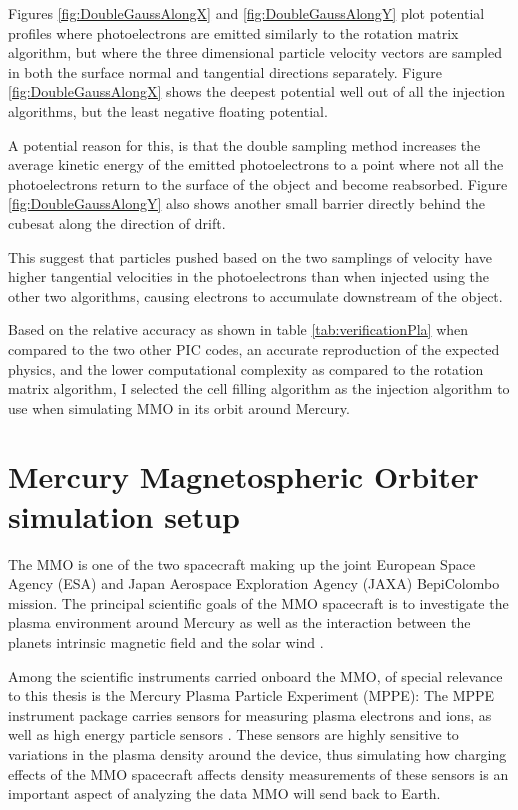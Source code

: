 Figures \ref{fig:DoubleGaussAlongX} and \ref{fig:DoubleGaussAlongY} plot potential profiles where photoelectrons are emitted similarly to the rotation matrix algorithm, but where the three dimensional particle velocity vectors are sampled in both the surface normal and tangential directions separately. Figure \ref{fig:DoubleGaussAlongX} shows the deepest potential well out of all the injection algorithms, but the least negative floating potential. 

A potential reason for this, is that the double sampling method increases the average kinetic energy of the emitted photoelectrons to a point where not all the photoelectrons return to the surface of the object and become reabsorbed. Figure \ref{fig:DoubleGaussAlongY} also shows another small barrier directly behind the cubesat along the direction of drift. 

This suggest that particles pushed based on the two samplings of velocity have higher tangential velocities in the photoelectrons than when injected using the other two algorithms, causing electrons to accumulate downstream of the object.


Based on the relative accuracy as shown in table \ref{tab:verificationPla} when compared to the two other PIC codes, an accurate reproduction of the expected physics, and the lower computational complexity as compared to the rotation matrix algorithm, I selected the cell filling algorithm as the injection algorithm to use when simulating MMO in its orbit around Mercury.


\section{Mercury Magnetospheric Orbiter simulation setup}
The MMO is one of the two spacecraft making up the joint European Space Agency (ESA) and Japan Aerospace Exploration Agency (JAXA) BepiColombo mission. The principal scientific goals of the MMO spacecraft is to investigate the plasma environment around Mercury as well as the interaction between the planets intrinsic magnetic field and the solar wind  \parencite{Benkhoff2009} \parencite{Saito2010}. 

Among the scientific instruments carried onboard the MMO, of special relevance to this thesis is the Mercury Plasma Particle Experiment (MPPE): The MPPE instrument package carries sensors for measuring plasma electrons and ions, as well as high energy particle sensors \parencite{Saito2010}. These sensors are highly sensitive to variations in the plasma density around the device, thus simulating how charging effects of the MMO spacecraft affects density measurements of these sensors is an important aspect of analyzing the data MMO will send back to Earth.

